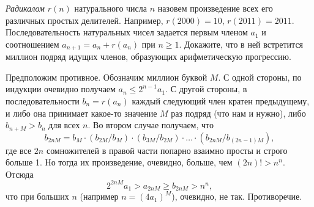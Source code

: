 \emph{Радикалом} $r(n)$ натурального числа $n$ назовем произведение всех его
различных простых делителей.
Например, $r(2000) = 10$, $r(2011) = 2011$.
Последовательность натуральных чисел задается первым членом $a_1$ и
соотношением $a_{n + 1} = a_n + r(a_n)$ при $n \geq 1$.
Докажите, что в ней встретится миллион подряд идущих членов, образующих
арифметическую прогрессию.

\solution
Предположим противное.
Обозначим миллион буквой $M$.
С одной стороны, по индукции очевидно получаем $a_n \leq 2^{n - 1} a_1$.
С другой стороны, в последовательности $b_n = r(a_n)$ каждый следующий член
кратен предыдущему, и либо она принимает какое-то значение $M$ раз подряд
(что нам и нужно), либо $b_{n + M} > b_{n}$ для всех $n$.
Во втором случае получаем, что
\[
    b_{2 n M}
=
    b_M \cdot (b_{2 M} / b_M) \cdot (b_{3 M} / b_{2 M})
    \cdot \ldots \cdot
    (b_{2 n M} / b_{(2 n - 1) M})
,\]
где все $2 n$ сомножителей в правой части попарно взаимно просты и строго
больше 1.
Но тогда их произведение, очевидно, больше, чем $(2 n)! > n^n$.
Отсюда 
\[
    2^{2 n M} a_1
>
    a_{2 n M}
\geq
    b_{2 n M}
>
    n^n
,\]
что при больших $n$ (например $n = (4 a_1)^M$), очевидно, не так.
Противоречие.

